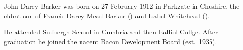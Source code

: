 
John Darcy Barker was born on 27 February 1912 in Parkgate in Cheshire, the eldest son of Francis Darcy Mead Barker () and Isabel Whitehead (). \cite{BalliolRegister1931, JDBarkerBirth}

He attended Sedbergh School in Cumbria and then Balliol Collge. After graduation he joined the nacent Bacon Development Board (est.~1935).\cite{BalliolRegister1931}
